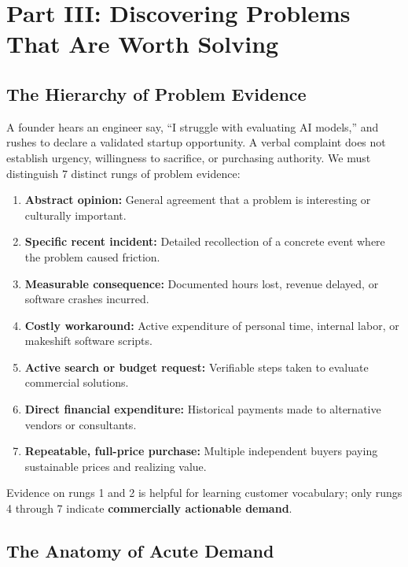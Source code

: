 \section{Part III: Discovering Problems That Are Worth Solving}

\subsection{The Hierarchy of Problem Evidence}

A founder hears an engineer say, ``I struggle with evaluating AI models,'' and rushes to declare a validated startup opportunity. A verbal complaint does not establish urgency, willingness to sacrifice, or purchasing authority. We must distinguish 7 distinct rungs of problem evidence:
\begin{enumerate}[leftmargin=1.2em,itemsep=0.2ex]
  \item \textbf{Abstract opinion:} General agreement that a problem is interesting or culturally important.
  \item \textbf{Specific recent incident:} Detailed recollection of a concrete event where the problem caused friction.
  \item \textbf{Measurable consequence:} Documented hours lost, revenue delayed, or software crashes incurred.
  \item \textbf{Costly workaround:} Active expenditure of personal time, internal labor, or makeshift software scripts.
  \item \textbf{Active search or budget request:} Verifiable steps taken to evaluate commercial solutions.
  \item \textbf{Direct financial expenditure:} Historical payments made to alternative vendors or consultants.
  \item \textbf{Repeatable, full-price purchase:} Multiple independent buyers paying sustainable prices and realizing value.
\end{enumerate}

Evidence on rungs 1 and 2 is helpful for learning customer vocabulary; only rungs 4 through 7 indicate \textbf{commercially actionable demand}.

\subsection{The Anatomy of Acute Demand}

